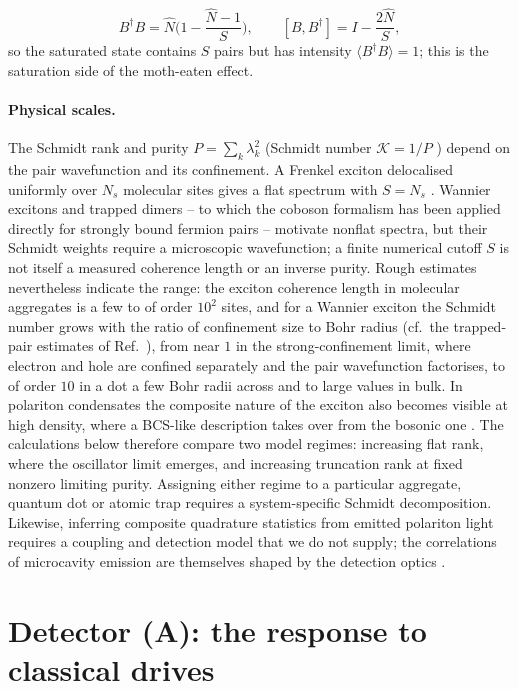 \documentclass[11pt,a4paper]{article}
\begin{document}
\begin{equation}
B^\dagger B=\hat N\Big(1-\frac{\hat N-1}{S}\Big),\qquad [B,B^\dagger]=I-\frac{2\hat N}{S},
\label{eq:intensity}
\end{equation}
so the saturated state contains $S$ pairs but has intensity $\langle B^\dagger B\rangle=1$; this is the saturation side of the moth-eaten effect.

\paragraph{Physical scales.}
The Schmidt rank and purity $P=\sum_k\lambda_k^2$ (Schmidt number $\mathcal K=1/P$ \cite{Law2005}) depend on the pair wavefunction and its confinement. A Frenkel exciton delocalised uniformly over $N_s$ molecular sites gives a flat spectrum with $S=N_s$ \cite{Shiau2017}. Wannier excitons and trapped dimers -- to which the coboson formalism has been applied directly for strongly bound fermion pairs \cite{Jimenez2023} -- motivate nonflat spectra, but their Schmidt weights require a microscopic wavefunction; a finite numerical cutoff $S$ is not itself a measured coherence length or an inverse purity. Rough estimates nevertheless indicate the range: the exciton coherence length in molecular aggregates is a few to of order $10^2$ sites, and for a Wannier exciton the Schmidt number grows with the ratio of confinement size to Bohr radius (cf.\ the trapped-pair estimates of Ref.~\cite{Law2005}), from near $1$ in the strong-confinement limit, where electron and hole are confined separately and the pair wavefunction factorises, to of order $10$ in a dot a few Bohr radii across and to large values in bulk. In polariton condensates the composite nature of the exciton also becomes visible at high density, where a BCS-like description takes over from the bosonic one \cite{Goodman2023}. The calculations below therefore compare two model regimes: increasing flat rank, where the oscillator limit emerges, and increasing truncation rank at fixed nonzero limiting purity. Assigning either regime to a particular aggregate, quantum dot or atomic trap requires a system-specific Schmidt decomposition. Likewise, inferring composite quadrature statistics from emitted polariton light \cite{Deng2010} requires a coupling and detection model that we do not supply; the correlations of microcavity emission are themselves shaped by the detection optics \cite{VanRegemortel2018}.

\section{Detector (A): the response to classical drives}
\label{sec:displacement}
\end{document}
